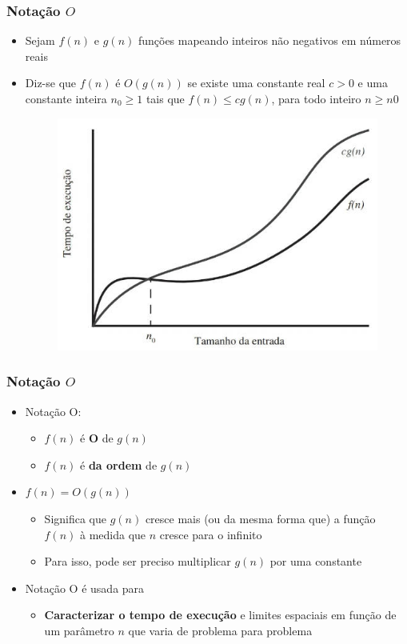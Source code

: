 \documentclass[aspectratio=169]{beamer}
\begin{document}
\begin{frame}\frametitle{Notação $O$}
\begin{itemize}
	\item Sejam $f(n)$ e $g(n)$ funções mapeando inteiros não negativos em números reais
	\item Diz-se que $f(n)$ é $O(g(n))$ se existe uma constante real $c > 0$ e uma constante inteira $n_0 \ge 1$ tais que
$f(n) \le cg(n)$, para todo inteiro $n \ge n0$
\begin{figure}[h]
	\centering
	\includegraphics[height=0.5\paperheight]{imagens/grafico_fx_gx.jpg}
\end{figure}
\end{itemize}
\end{frame}

\begin{frame}\frametitle{Notação $O$}
\begin{itemize}
	\item Notação O:
	\begin{itemize}
		\item $f(n)$ é \textbf{O} de $g(n)$
		\item $f(n)$ é \textbf{da ordem} de $g(n)$
	\end{itemize}
	\item $f(n)=O(g(n))$
	\begin{itemize}
		\item Significa que $g(n)$ cresce mais (ou da mesma forma que) a função $f(n)$ à medida que $n$ cresce para o infinito
		\item Para isso, pode ser preciso multiplicar $g(n)$ por uma constante
	\end{itemize}
	\item Notação O é usada para
	\begin{itemize}
		\item \textbf{Caracterizar o tempo de execução} e limites espaciais em função de um parâmetro $n$ que varia de problema para problema
	\end{itemize}
\end{itemize}
\end{frame}
\end{document}
